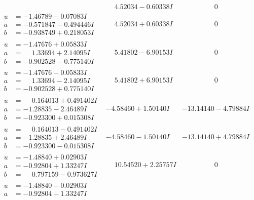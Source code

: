 \documentclass[1p]{elsarticle_modified}
\theoremstyle{definition}
\begin{document}
$$\begin{array}{c|c|c}
 & \phantom{-}4.52034 - 0.60338 I & \phantom{-0.000000 } 0 \\ \hline\begin{aligned}
u &= -1.46789 - 0.07083 I \\
a &= -0.571847 - 0.494446 I \\
b &= -0.938749 + 0.218053 I\end{aligned}
 & \phantom{-}4.52034 + 0.60338 I & \phantom{-0.000000 } 0 \\ \hline\begin{aligned}
u &= -1.47676 + 0.05833 I \\
a &= \phantom{-}1.33694 + 2.14095 I \\
b &= -0.902528 - 0.775140 I\end{aligned}
 & \phantom{-}5.41802 - 6.90153 I & \phantom{-0.000000 } 0 \\ \hline\begin{aligned}
u &= -1.47676 - 0.05833 I \\
a &= \phantom{-}1.33694 - 2.14095 I \\
b &= -0.902528 + 0.775140 I\end{aligned}
 & \phantom{-}5.41802 + 6.90153 I & \phantom{-0.000000 } 0 \\ \hline\begin{aligned}
u &= \phantom{-}0.164013 + 0.491402 I \\
a &= -1.28835 - 2.46489 I \\
b &= -0.923300 + 0.015308 I\end{aligned}
 & -4.58460 + 1.50140 I & -13.14140 - 4.79884 I \\ \hline\begin{aligned}
u &= \phantom{-}0.164013 - 0.491402 I \\
a &= -1.28835 + 2.46489 I \\
b &= -0.923300 - 0.015308 I\end{aligned}
 & -4.58460 - 1.50140 I & -13.14140 + 4.79884 I \\ \hline\begin{aligned}
u &= -1.48840 + 0.02903 I \\
a &= -0.92804 + 1.33247 I \\
b &= \phantom{-}0.797159 - 0.973627 I\end{aligned}
 & \phantom{-}10.54520 + 2.25757 I & \phantom{-0.000000 } 0 \\ \hline\begin{aligned}
u &= -1.48840 - 0.02903 I \\
a &= -0.92804 - 1.33247 I \\

\end{aligned}
\end{array}$$
\end{document}
